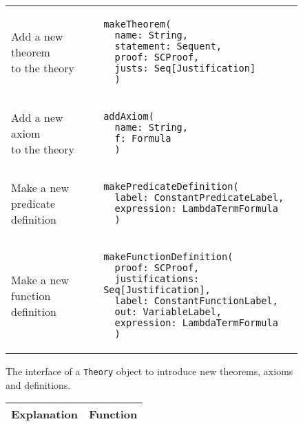 {\begin{figure}[hp]
\begin{center}
\begin{tabular}{l|l}
          \makecell[l]{Add a new theorem    \\to the theory} &
          \begin{lstlisting}
makeTheorem(
  name: String,
  statement: Sequent,
  proof: SCProof,
  justs: Seq[Justification]
  )
\end{lstlisting}
          \\ %

          \makecell[l]{Add a new axiom      \\ to the theory} &
          \begin{lstlisting}
addAxiom(
  name: String,
  f: Formula
  )
\end{lstlisting}
          \\ %

          \makecell[l]{Make a new           \\predicate definition} &
          \begin{lstlisting}
makePredicateDefinition(
  label: ConstantPredicateLabel,
  expression: LambdaTermFormula
  )
\end{lstlisting}
          \\ %

          \makecell[l]{Make a new           \\function definition} &
          \begin{lstlisting}
makeFunctionDefinition(
  proof: SCProof,
  justifications: Seq[Justification],
  label: ConstantFunctionLabel,
  out: VariableLabel,
  expression: LambdaTermFormula
  )
\end{lstlisting}
          \\ %

        \end{tabular}
        \caption{The interface of a \lstinline{Theory}{} object to introduce new theorems, axioms and definitions.}

        \label{fig:theorysetters}
      \end{center}
    \end{figure}







\iffalse
    \begin{figure}[hp]
      \begin{center}
        \begin{tabular}{l|l}
          Explanation & Function
          \\ \hline


\end{tabular}
\end{center}
\end{figure}}
